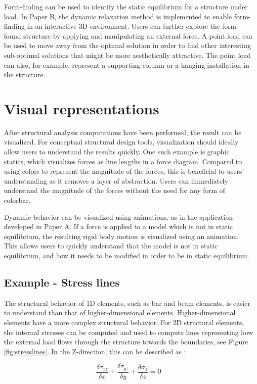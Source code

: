 Form-finding can be used to identify the static equilibrium for a structure under load. In Paper B, the dynamic relaxation method is implemented to enable form-finding in an interactive 3D environment. Users can further explore the form-found structure by applying and manipulating an external force. A point load can be used to move away from the optimal solution in order to find other interesting sub-optimal solutions that might be more aesthetically attractive. The point load can also, for example, represent a supporting column or a hanging installation in the structure.


\section{Visual representations}
After structural analysis computations have been performed, the result can be visualized. For conceptual structural design tools, visualization should ideally allow users to understand the results quickly. One such example is graphic statics, which visualizes forces as line lengths in a force diagram. Compared to using colors to represent the magnitude of the forces, this is beneficial to users’ understanding as it removes a layer of abstraction. Users can immediately understand the magnitude of the forces without the need for any form of colorbar.

Dynamic behavior can be visualized using animations, as in the application developed in Paper A. If a force is applied to a model which is not in static equilibrium, the resulting rigid body motion is visualized using an animation. This allows users to quickly understand that the model is not in static equilibrium, and how it needs to be modified in order to be in static equilibrium.

\subsection{Example - Stress lines}
The structural behavior of 1D elements, such as bar and beam elements, is easier to understand than that of higher-dimensional elements. Higher-dimensional elements have a more complex structural behavior. For 2D structural elements, the internal stresses can be computed and used to compute lines representing how the external load flows through the structure towards the boundaries, see Figure \ref{fig:stresslines}. In the Z-direction, this can be described as \cite{Fonseca1997}:

\begin{equation*}
\frac{\delta \tau_{xz}}{\delta x} + \frac{\delta \tau_{yz}}{\delta y} + \frac{\delta \sigma_{z}}{\delta z}= 0
\end{equation*}

